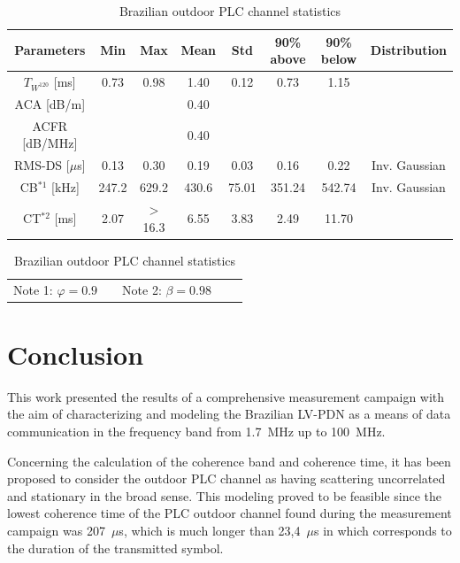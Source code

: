 \documentclass[journal]{IEEEtran}
\begin{document}
\begin{table}[!htb]
\centering
\caption{Brazilian outdoor PLC channel statistics}
\begin{tabular}{c|c|c|c|c|c|c|c}
\hline 
Parameters           & Min    & Max    & Mean     & Std     & 90\% above    & 90\% below & Distribution\\
\hline
$T_{W^{120}}$ [ms]   & 0.73   & 0.98   &  1.40    & 0.12    &  0.73         & 1.15       & \\
\hline
ACA [dB/m]          &        &        &  0.40    &         &               &            & \\
\hline
ACFR [dB/MHz]        &        &        &  0.40    &         &               &            & \\
\hline
RMS-DS [$\mu$s]      & 0.13   & 0.30   & 0.19     & 0.03    & 0.16          & 0.22       & Inv. Gaussian\\
\hline
CB$^{*1}$ [kHz]      & 247.2  & 629.2  & 430.6    & 75.01   & 351.24        & 542.74     & Inv. Gaussian\\
\hline
CT$^{*2}$ [ms]       & 2.07   & $>$16.3  & 6.55     & 3.83    & 2.49          & 11.70      & \\
\hline 
\end{tabular} \label{Tab:Estatisticas}
\newline
\begin{tabular}{ccccc}
Note 1: $\varphi = 0.9$ &  &Note 2: $\beta=0.98$ & & \\  
\end{tabular}
\end{table}


\section{Conclusion}\label{sec-conclusao}
This work presented the results of a comprehensive measurement campaign with the aim of characterizing and modeling the Brazilian \ac{LV-PDN} as a means of data communication in the frequency band from 1.7~MHz up to 100~MHz.

Concerning the calculation of the coherence band and coherence time, it has been proposed to consider the outdoor \ac{PLC} channel as having scattering uncorrelated and stationary in the broad sense. This modeling proved to be feasible since the lowest coherence time of the \ac{PLC} outdoor channel found during the measurement campaign was 207~$\mu$s, which is much longer than 23,4~$\mu$s in which corresponds to the duration of the transmitted symbol. 
\end{document}
